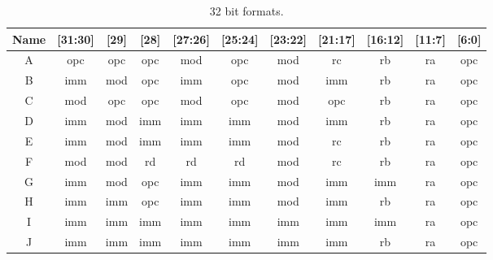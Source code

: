 \begin{table}[hbt!] %

    \begin{center}

    \begin{tabular}{|c|c|c|c|c|c|c|c|c|c|c|}

        \hline
        Name & [31:30] & [29] & [28] & [27:26] & [25:24] & [23:22] & [21:17] & [16:12] & [11:7] & [6:0]\\
        \hline
        \addlinespace[10pt]
        \hline
        A & opc & opc & opc & mod & opc & mod & rc & rb & ra & opc\\
        \hline
        B & imm & mod & opc & imm & opc & mod & imm & rb & ra & opc \\
        \hline
        C & mod & opc & opc & mod & opc & mod & opc & rb & ra & opc \\
        \hline
        D & imm & mod & imm & imm & imm & mod & imm & rb & ra & opc\\
        \hline
        E & imm & mod & imm & imm & imm & mod & rc & rb & ra & opc\\
        \hline
        F & mod & mod & rd & rd & rd & mod & rc & rb & ra & opc\\
        \hline
        G & imm & mod & opc & imm & imm & mod & imm & imm & ra & opc\\
        \hline
        H & imm & imm & opc & imm & imm & mod & imm & rb & ra & opc\\
        \hline
        I & imm & imm & imm & imm & imm & imm & imm & imm & ra & opc\\
        \hline
        J & imm & imm & imm & imm & imm & imm & imm & rb & ra & opc\\
        \hline

    \end{tabular}

    \caption[32 bit formats]{32 bit formats.}

    \end{center}

\end{table}